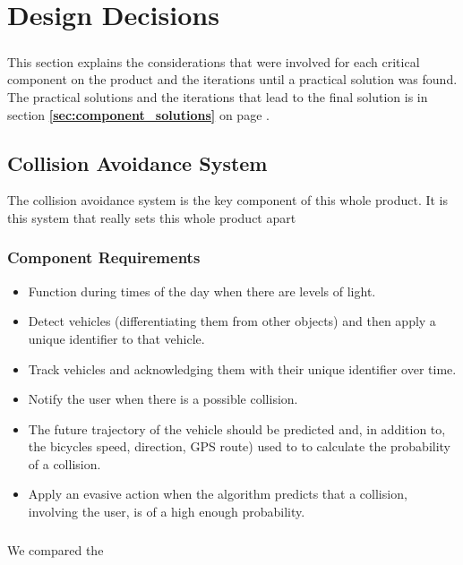 \documentclass[a4paper]{report}
\begin{document}
\chapter{Design Decisions}

\paragraph{}This section explains the considerations that were involved for each critical component on the product and the iterations until a practical solution was found. The practical solutions and the iterations that lead to the final solution is in section \textbf{\ref{sec:component_solutions} } on page \textbf{\pageref{sec:component_solutions}}. 

\section{Collision Avoidance System}
The collision avoidance system is the key component of this whole product. It is this system that really sets this whole product apart
\subsection{Component Requirements}
\begin{itemize}
  \item Function during times of the day when there are levels of light.
  \item Detect vehicles (differentiating them from other objects) and then apply a unique identifier to that vehicle.
  \item Track vehicles and acknowledging them with their unique identifier over time.
  \item Notify the user when there is a possible collision.
  \item The future trajectory of the vehicle should be predicted and, in addition to, the bicycles speed, direction, GPS route) used to to calculate the probability of a collision.
  \item Apply an evasive action when the algorithm predicts that a collision, involving the user, is of a high enough probability. 
\end{itemize}

\paragraph{}

We compared the 
\end{document}
